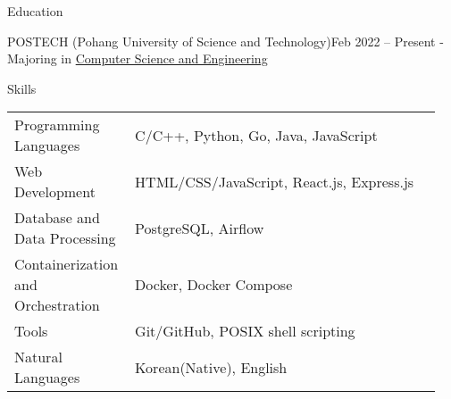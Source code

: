 \documentclass{resume}
\begin{document}
\begin{rSection}{Education}
    \begin{rSubsection}{POSTECH (Pohang University of Science and Technology)}{Feb 2022 -- Present}
        - Majoring in \href{https://cse.postech.ac.kr}{Computer Science and Engineering} \\
    \end{rSubsection}
\end{rSection}

\begin{rSection}{Skills}
    \begin{tabular}{@{}p{0.25\linewidth}p{0.7\linewidth}}
        Programming Languages
            & C/C++, Python, Go, Java, JavaScript \\ [0.5em]

        Web Development
            & HTML/CSS/JavaScript, React.js, Express.js \\ [0.5em]

        \raggedright Database and Data Processing
            & PostgreSQL, Airflow \\ [1.7em]

        \raggedright Containerization and Orchestration
            & Docker, Docker Compose \\ [1.7em]

        Tools
            & Git/GitHub, POSIX shell scripting \\ [0.5em]

        Natural Languages
            & Korean(Native), English \\ [0.5em]
    \end{tabular}
\end{rSection}
\end{document}
